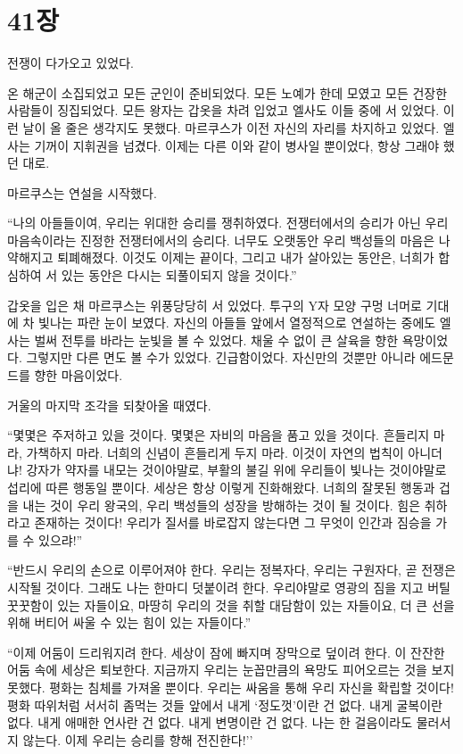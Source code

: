 ﻿
\chapter[41장  ~~][41장\hspace*{.5em}~~]{41장 \ ~~}



전쟁이 다가오고 있었다.

온 해군이 소집되었고 모든 군인이 준비되었다. 모든 노예가 한데 모였고 모든 건장한 사람들이 징집되었다. 모든 왕자는 갑옷을 차려 입었고 엘사도 이들 중에 서 있었다. 이런 날이 올 줄은 생각지도 못했다. 마르쿠스가 이전 자신의 자리를 차지하고 있었다. 엘사는 기꺼이 지휘권을 넘겼다. 이제는 다른 이와 같이 병사일 뿐이었다, 항상 그래야 했던 대로.

마르쿠스는 연설을 시작했다.

``나의 아들들이여, 우리는 위대한 승리를 쟁취하였다. 전쟁터에서의 승리가 아닌 우리 마음속이라는 진정한 전쟁터에서의 승리다. 너무도 오랫동안 우리 백성들의 마음은 나약해지고 퇴폐해졌다. 이것도 이제는 끝이다, 그리고 내가 살아있는 동안은, 너희가 합심하여 서 있는 동안은 다시는 되풀이되지 않을 것이다.''

갑옷을 입은 채 마르쿠스는 위풍당당히 서 있었다. 투구의 Y자 모양 구멍 너머로 기대에 차 빛나는 파란 눈이 보였다. 자신의 아들들 앞에서 열정적으로 연설하는 중에도 엘사는 벌써 전투를 바라는 눈빛을 볼 수 있었다. 채울 수 없이 큰 살육을 향한 욕망이었다. 그렇지만 다른 면도 볼 수가 있었다. 긴급함이었다. 자신만의 것뿐만 아니라 에드문드를 향한 마음이었다.

거울의 마지막 조각을 되찾아올 때였다.

``몇몇은 주저하고 있을 것이다. 몇몇은 자비의 마음을 품고 있을 것이다. 흔들리지 마라, 가책하지 마라. 너희의 신념이 흔들리게 두지 마라. 이것이 자연의 법칙이 아니더냐! 강자가 약자를 내모는 것이야말로, 부활의 불길 위에 우리들이 빛나는 것이야말로 섭리에 따른 행동일 뿐이다. 세상은 항상 이렇게 진화해왔다. 너희의 잘못된 행동과 겁을 내는 것이 우리 왕국의, 우리 백성들의 성장을 방해하는 것이 될 것이다. 힘은 취하라고 존재하는 것이다! 우리가 질서를 바로잡지 않는다면 그 무엇이 인간과 짐승을 가를 수 있으랴!''

``반드시 우리의 손으로 이루어져야 한다. 우리는 정복자다, 우리는 구원자다, 곧 전쟁은 시작될 것이다. 그래도 나는 한마디 덧붙이려 한다. 우리야말로 영광의 짐을 지고 버틸 꿋꿋함이 있는 자들이요, 마땅히 우리의 것을 취할 대담함이 있는 자들이요, 더 큰 선을 위해 버티어 싸울 수 있는 힘이 있는 자들이다.''

``이제 어둠이 드리워지려 한다. 세상이 잠에 빠지며 장막으로 덮이려 한다. 이 잔잔한 어둠 속에 세상은 퇴보한다. 지금까지 우리는 눈꼽만큼의 욕망도 피어오르는 것을 보지 못했다. 평화는 침체를 가져올 뿐이다. 우리는 싸움을 통해 우리 자신을 확립할 것이다! 평화 따위처럼 서서히 좀먹는 것들 앞에서 내게 `정도껏'이란 건 없다. 내게 굴복이란 없다. 내게 애매한 언사란 건 없다. 내게 변명이란 건 없다. 나는 한 걸음이라도 물러서지 않는다. 이제 우리는 승리를 향해 전진한다!''

